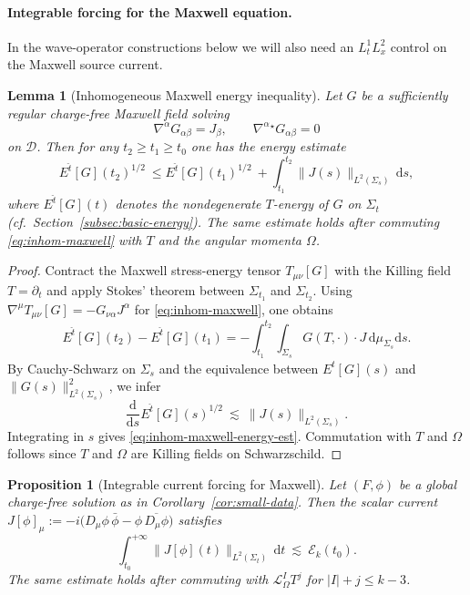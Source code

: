 \documentclass[11pt]{article}
\numberwithin{equation}{section}
\theoremstyle{plain}
\newtheorem{proposition}[theorem]{Proposition}
\newtheorem{lemma}[theorem]{Lemma}
\theoremstyle{definition}
\theoremstyle{remark}
\newcommand{\D}{\mathcal{D}}
\newcommand{\dd}{\mathrm{d}}
\begin{document}
\paragraph{Integrable forcing for the Maxwell equation.}
In the wave-operator constructions below we will also need an $L^{1}_{t}L^{2}_{x}$ control on the Maxwell source current.

\begin{lemma}[Inhomogeneous Maxwell energy inequality]\label{lem:inhom-maxwell-energy}
Let $G$ be a sufficiently regular charge-free Maxwell field solving
\begin{equation}\label{eq:inhom-maxwell}
\nabla^{\alpha}G_{\alpha\beta}=J_{\beta},
\qquad
\nabla^{\alpha}{}^{\star}G_{\alpha\beta}=0
\end{equation}
on $\D$.
Then for any $t_2\ge t_1\ge t_0$ one has the energy estimate
\begin{equation}\label{eq:inhom-maxwell-energy-est}
E^{\hat t}[G](t_2)^{1/2}
\ \le
E^{\hat t}[G](t_1)^{1/2}
\ +
\int_{t_1}^{t_2}\|J(s)\|_{L^{2}(\Sigma_s)}\,\dd s,
\end{equation}
where $E^{\hat t}[G](t)$ denotes the nondegenerate $T$-energy of $G$ on $\Sigma_t$ (cf.~Section~\ref{subsec:basic-energy}).
The same estimate holds after commuting \eqref{eq:inhom-maxwell} with $T$ and the angular momenta $\Omega$.
\end{lemma}

\begin{proof}
Contract the Maxwell stress-energy tensor $T_{\mu\nu}[G]$ with the Killing field $T=\partial_t$ and apply Stokes' theorem between $\Sigma_{t_1}$ and $\Sigma_{t_2}$.
Using $\nabla^{\mu}T_{\mu\nu}[G]= - G_{\nu\alpha}J^{\alpha}$ for \eqref{eq:inhom-maxwell}, one obtains
\begin{equation}
E^{\hat t}[G](t_2)-E^{\hat t}[G](t_1)
=
-\int_{t_1}^{t_2}\int_{\Sigma_s} G(T,\cdot)\cdot J\,\dd\mu_{\Sigma_s}\dd s.
\end{equation}
By Cauchy-Schwarz on $\Sigma_s$ and the equivalence between $E^{\hat t}[G](s)$ and $\|G(s)\|_{L^{2}(\Sigma_s)}^{2}$, we infer
\begin{equation}
\frac{\dd}{\dd s}E^{\hat t}[G](s)^{1/2}\ \lesssim\ \|J(s)\|_{L^{2}(\Sigma_s)}.
\end{equation}
Integrating in $s$ gives \eqref{eq:inhom-maxwell-energy-est}.
Commutation with $T$ and $\Omega$ follows since $T$ and $\Omega$ are Killing fields on Schwarzschild.
\end{proof}

\begin{proposition}[Integrable current forcing for Maxwell]\label{prop:integrable-current}
Let $(F,\phi)$ be a global charge-free solution as in Corollary~\ref{cor:small-data}.
Then the scalar current $J[\phi]_{\mu}:=-i\bigl(D_{\mu}\phi\,\bar\phi-\phi\,\overline{D_{\mu}\phi}\bigr)$ satisfies
\begin{equation}\label{eq:current-L1}
\int_{t_0}^{+\infty}\|J[\phi](t)\|_{L^{2}(\Sigma_t)}\,\dd t
\ \lesssim\ \mathcal E_k(t_0).
\end{equation}
The same estimate holds after commuting with $\mathcal L_{\Omega}^{I}T^{j}$ for $|I|+j\le k-3$.
\end{proposition}
\end{document}
